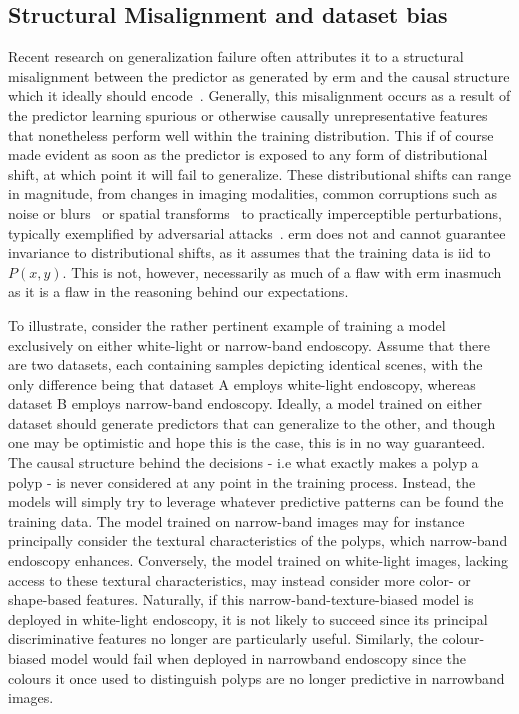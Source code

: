 	\subsection{Structural Misalignment and dataset bias}
	Recent research on generalization failure often attributes it to a structural misalignment between the predictor as generated by \gls{erm} and the causal structure which it ideally should encode~\cite{adversarial_bugs_features,shortcut_learning,IRM, causality}. Generally, this misalignment occurs as a result of the predictor learning spurious or otherwise causally unrepresentative features that nonetheless perform well within the training distribution. This if of course made evident as soon as the predictor is exposed to any form of distributional shift, at which point it will fail to generalize. These distributional shifts can range in magnitude, from changes in imaging modalities, common corruptions such as noise or blurs~\cite{corruption_robustness} or spatial transforms~\cite{spatial_robustness} to practically imperceptible perturbations, typically exemplified by adversarial attacks~\cite{adversarial_attacks}. \gls{erm} does not and cannot guarantee invariance to distributional shifts, as it assumes that the training data is \gls{iid} to \(P(x,y)\). This is not, however, necessarily as much of a flaw with \gls{erm} inasmuch as it is a flaw in the reasoning behind our expectations. 
		
	To illustrate, consider the rather pertinent example of training a model exclusively on either white-light or narrow-band endoscopy. Assume that there are two datasets, each containing samples depicting identical scenes, with the only difference being that dataset A employs white-light endoscopy, whereas dataset B employs narrow-band endoscopy. Ideally, a model trained on either dataset should generate predictors that can generalize to the other, and though one may be optimistic and hope this is the case, this is in no way guaranteed. The causal structure behind the decisions - i.e what exactly makes a polyp a polyp - is never considered at any point in the training process. Instead, the models will simply try to leverage whatever predictive patterns can be found the training data. The model trained on narrow-band images may for instance principally consider the textural characteristics of the polyps, which narrow-band endoscopy enhances. Conversely, the model trained on white-light images, lacking access to these textural characteristics, may instead consider more color- or shape-based features. Naturally, if this narrow-band-texture-biased model is deployed in white-light endoscopy, it is not likely to succeed since its principal discriminative features no longer are particularly useful. Similarly, the colour-biased model would fail when deployed in narrowband endoscopy since the colours it once used to distinguish polyps are no longer predictive in narrowband images.  

